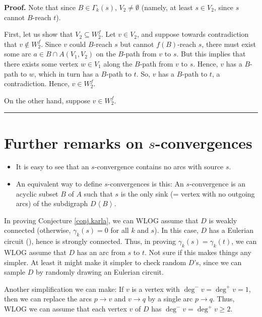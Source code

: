 \documentclass[numbers=enddot,12pt,final,onecolumn,notitlepage]{scrartcl}%
\theoremstyle{definition}
\newenvironment{proof}[1][Proof]{\noindent\textbf{#1.} }{\ \rule{0.5em}{0.5em}}
\newenvironment{noncompile}{}{}
\theoremstyle{plainsl}
\begin{document}
\begin{proof}
    Note that since $B \in \Gamma_{k}(s)$, $V_{2} \neq \emptyset$ (namely, at least $s \in V_{2}$, since $s$ cannot $B$-reach $t$).

    First, let us show that $V_{2} \subseteq W_{2}^f$. Let $v \in V_{2}$, and suppose towards contradiction that $v \notin W_{2}^f$. Since $v$ could $B$-reach $s$ but cannot $f(B)$-reach $s$, there must exist some arc $a \in B \cap A(V_{1},V_{2})$ on the $B$-path from $v$ to $s$. But this implies that there exists some vertex $w \in V_{1}$ along the $B$-path from $v$ to $s$. Hence, $v$ has a $B$-path to $w$, which in turn has a $B$-path to $t$. So, $v$ has a $B$-path to $t$, a contradiction. Hence, $v \in W_{2}^f$. 

    On the other hand, suppose $v \in W_{2}^f$.
\end{proof}

\section{Further remarks on $s$-convergences}

\begin{itemize}
\item It is easy to see that an $s$-convergence contains no arcs with source
$s$.

\item An equivalent way to define $s$-convergences is this: An $s$-convergence
is an acyclic subset $B$ of $A$ such that $s$ is the only sink (= vertex with
no outgoing arcs) of the subdigraph $D\left\langle B\right\rangle $.
\end{itemize}

\begin{noncompile}
In proving Conjecture \ref{conj.karla}, we can WLOG assume that $D$ is weakly
connected (otherwise, $\gamma_{k}\left(  s\right)  =0$ for all $k$ and $s$).
In this case, $D$ has a Eulerian circuit (\cite[Theorem 4.7.2]{22s}), hence is
strongly connected. Thus, in proving $\gamma_{k}\left(  s\right)  =\gamma
_{k}\left(  t\right)  $, we can WLOG assume that $D$ has an arc from $s$ to
$t$. Not sure if this makes things any simpler. At least it might make it
simpler to check random $D$'s, since we can sample $D$ by randomly drawing an
Eulerian circuit.

Another simplification we can make: If $v$ is a vertex with $\deg^{-}%
v=\deg^{+}v=1$, then we can replace the arcs $p\rightarrow v$ and
$v\rightarrow q$ by a single arc $p\rightarrow q$. Thus, WLOG we can assume
that each vertex $v$ of $D$ has $\deg^{-}v=\deg^{+}v\geq2$.
\end{noncompile}
\end{document}
